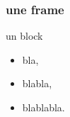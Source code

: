 \speaker{\Mathieu}

\begin{frame}
\frametitle{une frame}
\begin{block}{un block}
	\begin{itemize}
		\item bla,
		\item blabla,
		\item blablabla.
	\end{itemize}
\end{block}
\end{frame}
